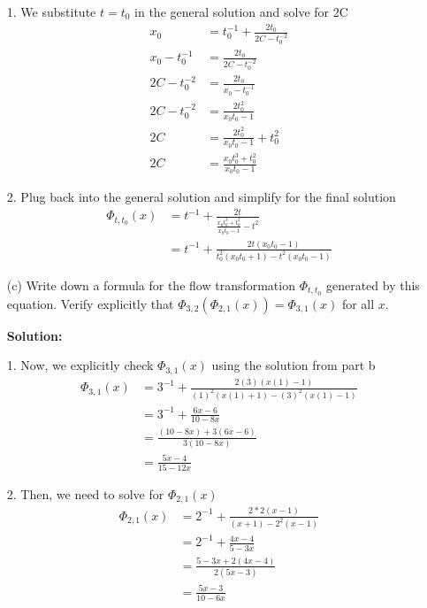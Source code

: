 \documentclass[12pt]{article}
\begin{document}
\begin{enumerate}
          1. We substitute $t = t_0$ in the general solution and solve for 2C
          \begin{align*}
              x_0            & = t_0^{-1} + \frac{2t_0}{2C-t_0^{-2}} \\
              x_0 - t_0^{-1} & = \frac{2t_0}{2C-t_0^{-2}}            \\
              2C-t_0^{-2}    & = \frac{2t_0}{ x_0 - t_0^{-1}}        \\
              2C-t_0^{-2}    & = \frac{2t_0^2}{ x_0t_0 - 1}          \\
              2C             & = \frac{2t_0^2}{ x_0t_0 - 1} + t_0^2  \\
              2C             & = \frac{x_0t_0^3+t_0^2}{ x_0t_0 - 1}
          \end{align*}

          2. Plug back into the general solution and simplify for the final solution
          \begin{align*}
              \Phi{}_{t, t_0}(x) & = t^{-1} + \frac{2t}{\frac{x_0t_0^3+t_0^2}{ x_0t_0 - 1}-t^{2}}      \\
                                 & = t^{-1} + \frac{2t(x_0t_0 - 1)}{t_0^2(x_0t_0+1)-t^{2}(x_0t_0 - 1)}
          \end{align*}



    \item[(c)] Write down a formula for the flow transformation $\Phi_{t,t_0}$ generated by this equation. Verify explicitly that $\Phi_{3,2}(\Phi_{2,1}(x)) = \Phi_{3,1}(x)$ for all $x$.

          \textbf{Solution:}

          1. Now, we explicitly check $\Phi{}_{3,1}(x)$ using the solution from part b
          \begin{align*}
              \Phi{}_{3,1}(x) & = 3^{-1} + \frac{2(3)(x(1) - 1)}{(1)^2(x(1)+1)-(3)^{2}(x(1) - 1)} \\
                              & = 3^{-1} + \frac{6x - 6}{10 - 8x}                                 \\
                              & = \frac{(10-8x)+3(6x-6)}{3(10-8x)}                                \\
                              & = \frac{5x-4}{15-12x}
          \end{align*}

          2. Then, we need to solve for $\Phi{}_{2,1}(x)$
          \begin{align*}
              \Phi{}_{2,1}(x) & = 2^{-1} + \frac{2*2(x - 1)}{(x+1)-2^{2}(x - 1)} \\
                              & = 2^{-1} + \frac{4x-4}{5-3x}                     \\
                              & = \frac{5-3x + 2(4x-4)}{2(5x-3)}                 \\
                              & = \frac{5x-3}{10-6x}
          \end{align*}


\end{enumerate}
\end{document}
